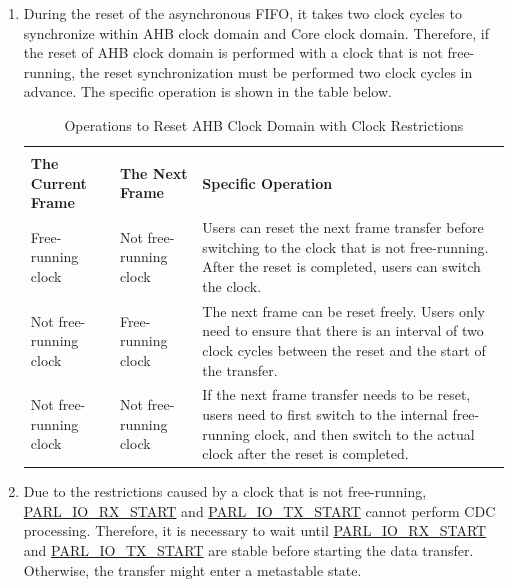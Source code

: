 \documentclass[main\_\_EN.tex]{subfiles}
\begin{document}
\begin{enumerate}
    \item During the reset of the asynchronous FIFO, it takes two clock cycles to synchronize within AHB clock domain and Core clock domain. Therefore, if the reset of AHB clock domain is performed with a clock that is not free-running, the reset synchronization must be performed two clock cycles in advance. The specific operation is shown in the table below.
    
\begin{table}[H]
    \centering
    \caption{Operations to Reset AHB Clock Domain with Clock Restrictions}
    \label{tab:parlio-ahb-reset-clk-restriction}
    
    \begin{tabular}{|l|l|p{9cm}|}
    \hline
        \rowcolor{lightgray}
        \multicolumn{2}{|c|}{\textbf{Clock Restriction}} & \\
        \rowcolor{lightgray}
        \textbf{The Current Frame} & \textbf{The Next Frame} & \multirow{-2}{*}{\textbf{Specific Operation}} \\ \hline
    
        Free-running clock    & Not free-running clock  & Users can reset the next frame transfer before switching to the clock that is not free-running. After the reset is completed, users can switch the clock.    \\ \hline
        Not free-running clock  & Free-running clock    & The next frame can be reset freely. Users only need to ensure that there is an interval of two clock cycles between the reset and the start of the transfer.     \\ \hline
        Not free-running clock  & Not free-running clock  & If the next frame transfer needs to be reset, users need to first switch to the internal free-running clock, and then switch to the actual clock after the reset is completed.      \\ \hline
    \end{tabular}
\end{table}
    
    \item Due to the restrictions caused by a clock that is not free-running, \hyperref[fielddesc:PARLIORXSTART]{PARL\_IO\_RX\_START} and \hyperref[fielddesc:PARLIOTXSTART]{PARL\_IO\_TX\_START} cannot perform CDC processing. Therefore, it is necessary to wait until \hyperref[fielddesc:PARLIORXSTART]{PARL\_IO\_RX\_START} and \hyperref[fielddesc:PARLIOTXSTART]{PARL\_IO\_TX\_START} are stable before starting the data transfer. Otherwise, the transfer might enter a metastable state. 
    

\end{enumerate}
\end{document}

